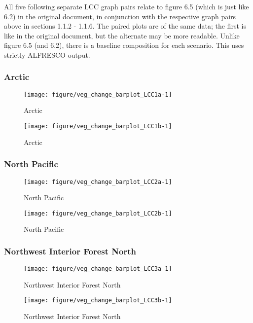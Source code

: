 \documentclass{article}\usepackage[]{graphicx}\usepackage[]{color}
\makeatletter
\def\maxwidth{ %
  \ifdim\Gin@nat@width>\linewidth
    \linewidth
  \else
    \Gin@nat@width
  \fi
}
\makeatother
\begin{document}
All five following separate LCC graph pairs relate to figure 6.5 (which is just like 6.2) in the original document, in conjunction with the respective graph pairs above in sections 1.1.2 - 1.1.6.
The paired plots are of the same data; the first is like in the original document, but the alternate may be more readable.
Unlike figure 6.5 (and 6.2), there is a baseline composition for each scenario.
This uses strictly ALFRESCO output.
\subsubsection{Arctic}
\begin{figure}[H]
\texttt{[image: figure/veg\_change\_barplot\_LCC1a-1]} \caption[Arctic]{Arctic\label{fig:veg_change_barplot_LCC1a}}
\end{figure}


\begin{figure}[H]
\texttt{[image: figure/veg\_change\_barplot\_LCC1b-1]} \caption[Arctic]{Arctic\label{fig:veg_change_barplot_LCC1b}}
\end{figure}



\subsubsection{North Pacific}
\begin{figure}[H]
\texttt{[image: figure/veg\_change\_barplot\_LCC2a-1]} \caption[North Pacific]{North Pacific\label{fig:veg_change_barplot_LCC2a}}
\end{figure}


\begin{figure}[H]
\texttt{[image: figure/veg\_change\_barplot\_LCC2b-1]} \caption[North Pacific]{North Pacific\label{fig:veg_change_barplot_LCC2b}}
\end{figure}



\subsubsection{Northwest Interior Forest North}
\begin{figure}[H]
\texttt{[image: figure/veg\_change\_barplot\_LCC3a-1]} \caption[Northwest Interior Forest North]{Northwest Interior Forest North\label{fig:veg_change_barplot_LCC3a}}
\end{figure}


\begin{figure}[H]
\texttt{[image: figure/veg\_change\_barplot\_LCC3b-1]} \caption[Northwest Interior Forest North]{Northwest Interior Forest North\label{fig:veg_change_barplot_LCC3b}}
\end{figure}
\end{document}
